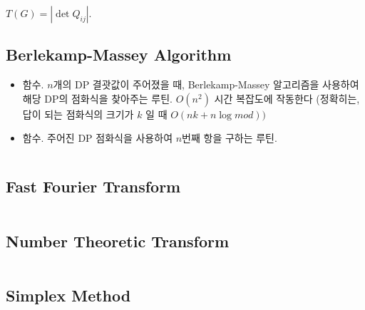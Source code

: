 $T(G) = |\det Q_{ij}|$.

\subsection{Berlekamp-Massey Algorithm}
\begin{itemize}
    \item {} 함수. $n$개의 DP 결괏값이 주어졌을 때, Berlekamp-Massey 알고리즘을 사용하여 해당 DP의 점화식을 찾아주는 루틴. $O(n^2)$ 시간 복잡도에 작동한다 (정확히는, 답이 되는 점화식의 크기가 $k$ 일 때 $O(nk+n\log mod))$
    \item {} 함수. 주어진 DP 점화식을 사용하여 $n$번째 항을 구하는 루틴.
\end{itemize}
\inputminted{cpp}{src/Math/berlekamp.cpp}
\fi


\subsection{Fast Fourier Transform}
\inputminted{cpp}{src/Math/fft.cpp} %

\subsection{Number Theoretic Transform}
\inputminted{cpp}{src/Math/ntt.cpp} %

\subsection{Simplex Method}
\inputminted{cpp}{src/Math/simplex.cpp} %

